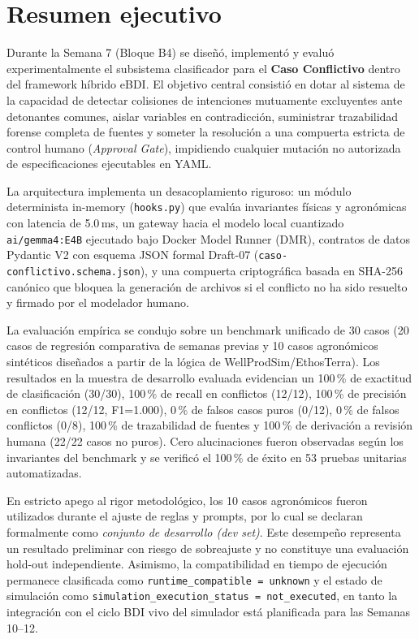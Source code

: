 \documentclass[11pt,a4paper]{article}
\begin{document}
\section{Resumen ejecutivo}
Durante la Semana 7 (Bloque B4) se diseñó, implementó y evaluó experimentalmente el subsistema clasificador para el \textbf{Caso Conflictivo} dentro del framework híbrido eBDI. El objetivo central consistió en dotar al sistema de la capacidad de detectar colisiones de intenciones mutuamente excluyentes ante detonantes comunes, aislar variables en contradicción, suministrar trazabilidad forense completa de fuentes y someter la resolución a una compuerta estricta de control humano (\textit{Approval Gate}), impidiendo cualquier mutación no autorizada de especificaciones ejecutables en YAML.

La arquitectura implementa un desacoplamiento riguroso: un módulo determinista in-memory (\texttt{hooks.py}) que evalúa invariantes físicas y agronómicas con latencia de 5.0\,ms, un gateway hacia el modelo local cuantizado \texttt{ai/gemma4:E4B} ejecutado bajo Docker Model Runner (DMR), contratos de datos Pydantic V2 con esquema JSON formal Draft-07 (\texttt{caso-conflictivo.schema.json}), y una compuerta criptográfica basada en SHA-256 canónico que bloquea la generación de archivos si el conflicto no ha sido resuelto y firmado por el modelador humano.

La evaluación empírica se condujo sobre un benchmark unificado de 30 casos (20 casos de regresión comparativa de semanas previas y 10 casos agronómicos sintéticos diseñados a partir de la lógica de WellProdSim/EthosTerra). Los resultados en la muestra de desarrollo evaluada evidencian un 100\,\% de exactitud de clasificación (30/30), 100\,\% de recall en conflictos (12/12), 100\,\% de precisión en conflictos (12/12, F1=1.000), 0\,\% de falsos casos puros (0/12), 0\,\% de falsos conflictos (0/8), 100\,\% de trazabilidad de fuentes y 100\,\% de derivación a revisión humana (22/22 casos no puros). Cero alucinaciones fueron observadas según los invariantes del benchmark y se verificó el 100\,\% de éxito en 53 pruebas unitarias automatizadas.

En estricto apego al rigor metodológico, los 10 casos agronómicos fueron utilizados durante el ajuste de reglas y prompts, por lo cual se declaran formalmente como \textit{conjunto de desarrollo (dev set)}. Este desempeño representa un resultado preliminar con riesgo de sobreajuste y no constituye una evaluación hold-out independiente. Asimismo, la compatibilidad en tiempo de ejecución permanece clasificada como \texttt{runtime\_compatible = unknown} y el estado de simulación como \texttt{simulation\_execution\_status = not\_executed}, en tanto la integración con el ciclo BDI vivo del simulador está planificada para las Semanas 10--12.
\end{document}
